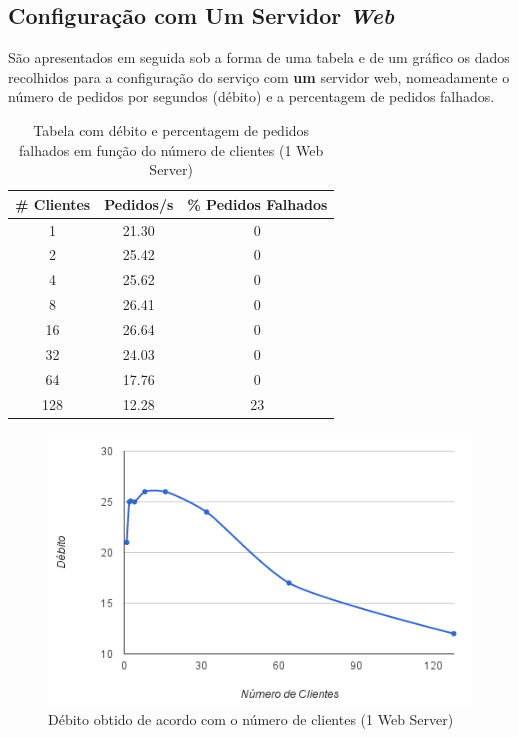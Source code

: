 \subsection{Configuração com Um Servidor \textit{Web}}


São apresentados em seguida sob a forma de uma tabela e de um gráfico os dados recolhidos para a configuração do serviço com \textbf{um} servidor web, nomeadamente o número de pedidos por segundos (débito) e a percentagem de pedidos falhados. \\

\begin{table}[!h]
\centering
\begin{tabular}{|c|c|c|}
\hline
\textbf{\# Clientes} & \textbf{Pedidos/s} & \textbf{\% Pedidos Falhados} \\ \hline
1 & 21.30 & 0 \\ \hline
2 & 25.42 & 0 \\ \hline
4 & 25.62 & 0 \\ \hline
8 & 26.41 & 0 \\ \hline
16 & 26.64 & 0 \\ \hline
32 & 24.03 & 0 \\ \hline
64 & 17.76 & 0 \\ \hline
128 & 12.28 & 23 \\ \hline
\end{tabular}
\caption{Tabela com débito e percentagem de pedidos falhados em função do número de clientes (1 Web Server)}
\end{table}

\begin{figure}[!h]
\centering
\includegraphics[scale=.6]{img/ab/web1.png}
\caption{Débito obtido de acordo com o número de clientes (1 Web Server)}
\end{figure}

